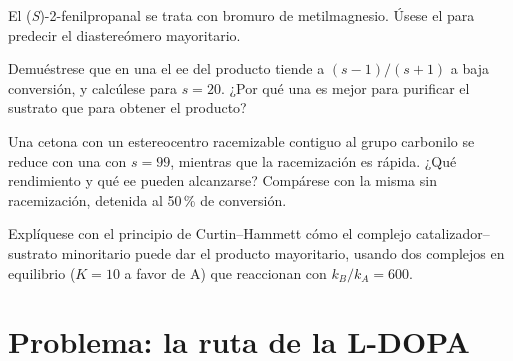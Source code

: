 \begin{exercise}[$\star\star$]\label{exo:b3:asymmetric-synthesis:9}
El (\textit{S})-2-fenilpropanal se trata con bromuro de metilmagnesio. Úsese el  para predecir el diastereómero mayoritario.
\end{exercise}

\begin{exercise}[$\star\star\star$]\label{exo:b3:asymmetric-synthesis:10}
Demuéstrese que en una  el ee del producto tiende a $(s - 1)/(s + 1)$ a baja
conversión, y calcúlese para $s = 20$. ¿Por qué una  es mejor para purificar
el sustrato que para obtener el producto?
\end{exercise}

\begin{exercise}[$\star\star\star$]\label{exo:b3:asymmetric-synthesis:11}
Una cetona con un estereocentro racemizable contiguo al grupo carbonilo se reduce con
una  con $s = 99$, mientras que la racemización es rápida. ¿Qué rendimiento y qué ee pueden
alcanzarse? Compárese con la misma  sin racemización, detenida al 50\,\% de
conversión.
\end{exercise}

\begin{exercise}[$\star\star\star$]\label{exo:b3:asymmetric-synthesis:12}
Explíquese con el principio de Curtin--Hammett cómo el complejo catalizador--sustrato minoritario
puede dar el producto mayoritario, usando dos complejos en equilibrio
($K = 10$ a favor de A) que reaccionan con $k_B/k_A = 600$.
\end{exercise}

\section{Problema: la ruta de la L-DOPA}

